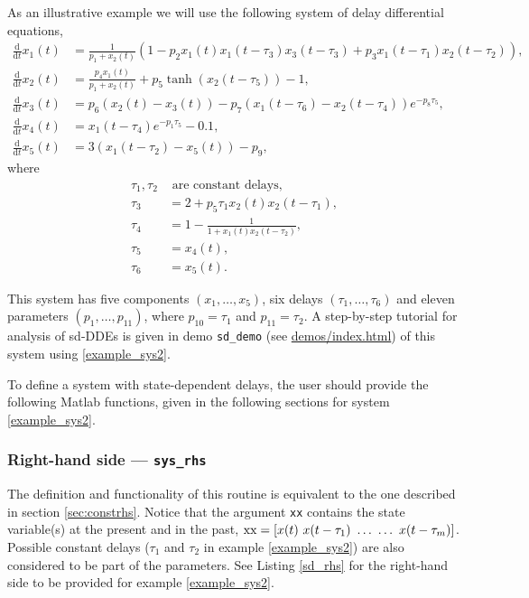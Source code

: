 \documentclass[10pt]{scrartcl}
\newcommand{\demobase}{\url{demos/index.html}}
\renewcommand{\d}{\mathrm{d}}
\newcommand{\blist}[1]{\mbox{\lstinline!#1!}}
\begin{document}
As an illustrative example we will use the following system of delay 
differential equations,
\begin{equation}\label{example_sys2}
  \begin{split}
    \frac{\d}{\d t}x_1(t)&=\frac{1}{p_1+x_2(t)}\left(1-p_2x_1(t)x_1(t-\tau_3)
      x_3(t-\tau_3)+p_3x_1(t-\tau_1)x_2(t-\tau_2)\right),\\
    \frac{\d}{\d t}x_2(t)&=\frac{p_4 x_1(t)}{p_1+x_2(t)}+
    p_5\tanh(x_2(t-\tau_5))-1,\\
    \frac{\d}{\d t}x_3(t)&=p_6(x_2(t)-x_3(t))-p_7(x_1(t-\tau_6)-x_2(t-\tau_4))e^{-p_8 \tau_5},\\
    \frac{\d}{\d t}x_4(t)&=x_1(t-\tau_4)e^{-p_1 \tau_5} -0.1,\\
    \frac{\d}{\d t}x_5(t)&=3(x_1(t-\tau_2)-x_5(t))-p_9,
  \end{split}
\end{equation}
where
\begin{align*}
\tau_1, \tau_2 &\mbox{ are constant delays},\\
\tau_3&=2+p_5\tau_1x_2(t)x_2(t-\tau_1),\\
\tau_4&=1-\frac{1}{1+x_1(t)x_2(t-\tau_2)},\\
\tau_5&=x_4(t),\\
\tau_6&=x_5(t).
\end{align*}

This system has five components $(x_1,\ldots,x_5)$, six delays
$(\tau_1,\ldots,\tau_6)$ and eleven parameters $(p_1,\ldots,p_{11})$,
where $p_{10}=\tau_1$ and $p_{11}=\tau_2$.  A step-by-step tutorial
for analysis of sd-DDEs is given in demo \texttt{sd\_demo} (see
\demobase{}) of this system using \eqref{example_sys2}.

To define a system with state-dependent delays, the user should
provide the following Matlab functions, given in the following
sections for system \eqref{example_sys2}.


\subsubsection{Right-hand side --- \blist{sys_rhs}}
\label{sec:sdrhs}
The definition and functionality of this routine is equivalent to the
one described in section \ref{sec:constrhs}.  Notice that the argument
\blist{xx} contains the state variable(s) at the present and in the
past, $\blist{xx}=[x(t)\ x(t-\tau_1)\ \ldots\ \ldots\ x(t-\tau_m)]$.
Possible constant delays ($\tau_1$ and $\tau_2$ in example
\eqref{example_sys2}) are also considered to be part of the
parameters. See Listing \ref{sd_rhs} for the right-hand side to be
provided for example \eqref{example_sys2}.

\end{document}
